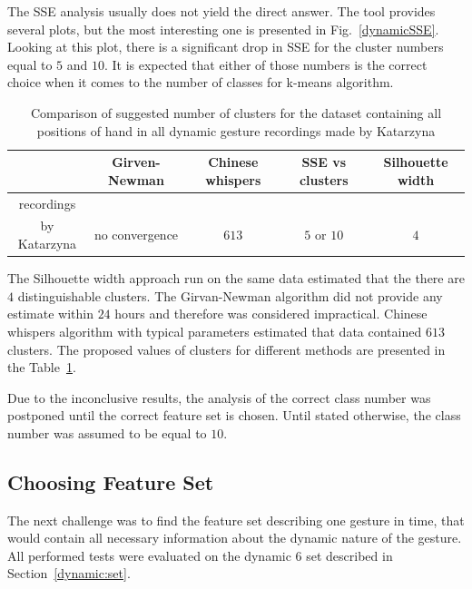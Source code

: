 The SSE analysis usually does not yield the direct answer.
The tool provides several plots, but the most interesting one is presented in Fig.~\ref{dynamicSSE}. 
Looking at this plot, there is a significant drop in SSE for the cluster numbers equal to $5$ and $10$.
It is expected that either of those numbers is the correct choice when it comes to the number of classes for k-means algorithm.

\begin{table}[htbp!]
 \caption{Comparison of suggested number of clusters for the dataset containing all positions of hand in all dynamic gesture recordings made by Katarzyna}
 \label{clusterwyn}
    \begin{tabular}{ccccc}
    \hline
     & Girven-Newman & Chinese whispers   & SSE vs clusters & Silhouette width  \\ \hline \hline
    recordings \\by Katarzyna          & no convergence      & $613$ & $5$ or $10$     & $4$     \\ \hline
    \end{tabular}
\end{table}

The Silhouette width approach run on the same data estimated that the there are $4$ distinguishable clusters.
The Girvan-Newman algorithm did not provide any estimate within $24$ hours and therefore was considered impractical.
Chinese whispers algorithm with typical parameters estimated that data contained $613$ clusters.
The proposed values of clusters for different methods are presented in the Table~\ref{clusterwyn}.

Due to the inconclusive results, the analysis of the correct class number was postponed until the correct feature set is chosen.
Until stated otherwise, the class number was assumed to be equal to $10$.

\subsection{Choosing Feature Set}
The next challenge was to find the feature set describing one gesture in time, that would contain all necessary information about the dynamic nature of the gesture. 
All performed tests were evaluated on the dynamic 6 set described in Section~\ref{dynamic:set}.

